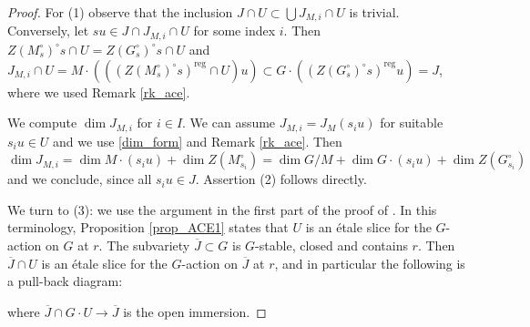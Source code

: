 \documentclass[12pt]{amsart}
\theoremstyle{definition}
\theoremstyle{remark}
\newcommand{\reg}{{\operatorname{reg}}}
\begin{document}
\begin{proof}
For (1) observe that the inclusion $J \cap U \subset \bigcup J_{M,i} \cap U$ is trivial. Conversely, let $su \in J \cap  J_{M,i} \cap U$ for some index $i$.
Then $Z(M_s^\circ)^\circ s \cap U = Z(G_s^\circ)^\circ s \cap U$ 
and $J_{M,i} \cap U =
M \cdot ( ((Z(M_s^\circ)^\circ s)^\reg \cap U) u)
\subset G \cdot ((Z(G_s^\circ)^\circ s)^\reg u)  = J$, where we used Remark \ref{rk_ace}.

We compute $\dim J_{M,i}$ for $i \in I$.
We can assume $ J_{M,i} = J_M(s_i u)$ for suitable $s_i u \in U$ and we use \eqref{dim_form} and Remark \ref{rk_ace}.
Then $\dim J_{M,i} = \dim M \cdot (s_i u) + \dim Z(M_{s_i}^\circ) = \dim G/M + \dim G \cdot (s_i u) + \dim Z(G_{s_i}^\circ)$ and we conclude, since all $s_i u \in J$.
Assertion (2) follows directly.

We turn to (3): we use the argument in the first part of the proof of \cite[Proposition 7.5]{BR}. In this terminology, Proposition \ref{prop_ACE1} states that $U$ is an \'etale slice for the $G$-action on $G$ at $r$.
The subvariety $\overline{J} \subset G$ is $G$-stable, closed and contains $r$.
Then  $\overline{J} \cap U$ is an \'etale slice for the $G$-action on $\overline{J}$ at $r$, and in particular
 the following is a pull-back diagram:
 \begin{center}
\end{center}
where $\overline{J} \cap G \cdot U \to \overline{J}$ is the open immersion.


\end{proof}
\end{document}
